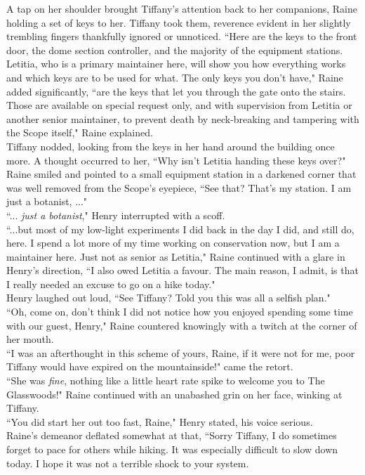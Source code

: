 A tap on her shoulder brought Tiffany's attention back to her companions, Raine holding a set of keys to her.
Tiffany took them, reverence evident in her slightly trembling fingers thankfully ignored or unnoticed.
``Here are the keys to the front door, the dome section controller, and the majority of the equipment stations. Letitia, who is a primary maintainer here, will show you how everything works and which keys are to be used for what. The only keys you don't have," Raine added significantly, ``are the keys that let you through the gate onto the stairs. Those are available on special request only, and with supervision from Letitia or another senior maintainer, to prevent death by neck-breaking and tampering with the Scope itself," Raine explained.\\

Tiffany nodded, looking from the keys in her hand around the building once more.
A thought occurred to her, ``Why isn't Letitia handing these keys over?"\\
Raine smiled and pointed to a small equipment station in a darkened corner that was well removed from the Scope's eyepiece, ``See that? That's my station. I am just a botanist, ..."\\
``... \textit{just a botanist}," Henry interrupted with a scoff.\\
``...but most of my low-light experiments I did back in the day I did, and still do, here. I spend a lot more of my time working on conservation now, but I am a maintainer here. Just not as senior as Letitia," Raine continued with a glare in Henry's direction, ``I also owed Letitia a favour. The main reason, I admit, is that I really needed an excuse to go on a hike today."\\

Henry laughed out loud, ``See Tiffany? Told you this was all a selfish plan."\\
``Oh, come on, don't think I did not notice how you enjoyed spending some time with our guest, Henry," Raine countered knowingly with a twitch at the corner of her mouth.\\
``I was an afterthought in this scheme of yours, Raine, if it were not for me, poor Tiffany would have expired on the mountainside!" came the retort.\\
``She was \textit{fine}, nothing like a little heart rate spike to welcome you to The Glasswoods!" Raine continued with an unabashed grin on her face, winking at Tiffany.\\
``You did start her out too fast, Raine," Henry stated, his voice serious.\\
Raine's demeanor deflated somewhat at that, ``Sorry Tiffany, I do sometimes forget to pace for others while hiking. It was especially difficult to slow down today. I hope it was not a terrible shock to your system.\\

